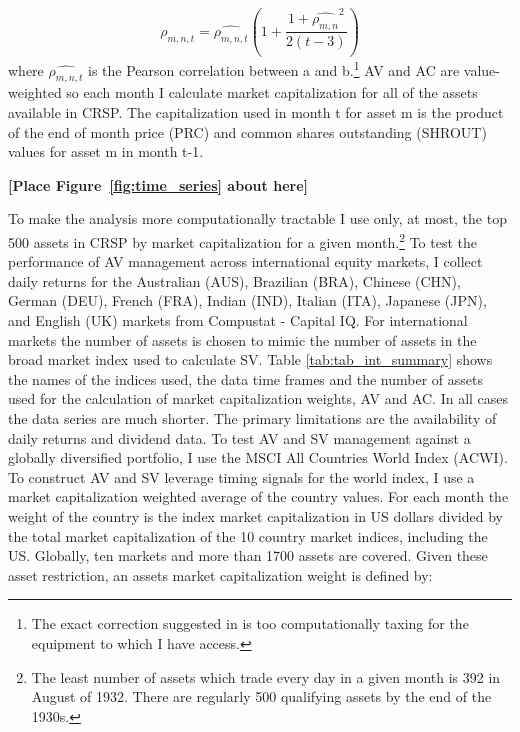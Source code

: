 \begin{equation}
	\rho_{m,n,t} = \widehat{\rho_{m,n,t}}\left(1 + \frac{1+\widehat{\rho_{m,n}}^{2}}{2(t-3)}\right)
\end{equation}
where $\widehat{\rho_{m,n,t}}$ is the Pearson correlation between a and b.\footnote{The exact correction suggested in \cite{olkin_1958} is too computationally taxing for the equipment to which I have access.} AV and AC are value-weighted so each month I calculate market capitalization for all of the assets available in CRSP. The capitalization used in month t for asset m is the product of the end of month price (PRC) and common shares outstanding (SHROUT) values for asset m in month t-1. \\
\bigskip
\centerline{\bf [Place Figure~\ref{fig:time_series} about here]}
\bigskip
To make the analysis more computationally tractable I use only, at most, the top 500 assets in CRSP by market capitalization for a given month.\footnote{The least number of assets which trade every day in a given month is 392 in August of 1932. There are regularly 500 qualifying assets by the end of the 1930s.} To test the performance of AV management across international equity markets, I collect daily returns for the Australian (AUS), Brazilian (BRA), Chinese (CHN), German (DEU), French (FRA), Indian (IND), Italian (ITA), Japanese (JPN), and English (UK) markets from Compustat - Capital IQ. For international markets the number of assets is chosen to mimic the number of assets in the broad market index used to calculate SV.  Table \ref{tab:tab_int_summary} shows the names of the indices used, the data time frames and the number of assets used for the calculation of market capitalization weights, AV and AC. In all cases the data series are much shorter. The primary limitations are the availability of daily returns and dividend data. To test AV and SV management against a globally diversified portfolio, I use the MSCI All Countries World Index (ACWI). To construct AV and SV leverage timing signals for the world index, I use a market capitalization weighted average of the country values. For each month the weight of the country is the index market capitalization in US dollars divided by the total market capitalization of the 10 country market indices, including the US. Globally, ten markets and more than 1700 assets are covered. Given these asset restriction, an assets market capitalization weight is defined by:
